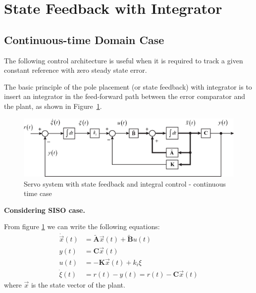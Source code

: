 \documentclass[11pt,a4paper,oneside]{book}
\numberwithin{equation}{section}
\theoremstyle{it}
\theoremstyle{definition}
\begin{document}
\section{State Feedback with Integrator}
\subsection{Continuous-time Domain Case}
The following control architecture is useful when it is required to track a 
given constant reference with zero steady state error.

The basic principle of the pole placement (or state feedback) with integrator 
is to insert an integrator in the feed-forward path between the error 
comparator and the plant, as shown in Figure~\ref{figure_servo_tc_1}.
\begin{figure}[H]
	\centering
	\includegraphics[width = 440pt, 
	keepaspectratio]{figures/servo_ct_3.eps}
	\captionsetup{width=0.5\textwidth, font=small}
	\caption{Servo system with state feedback and integral control - continuous 
		time case}
	\label{figure_servo_tc_1}
\end{figure}

\noindent\textbf{Considering SISO case.}

From figure \ref{figure_servo_tc_1} we can write the following equations:
\begin{equation}\label{eq_servo_ct_1}
	\begin{aligned}
		\dot{\vec{x}}(t) &= 
		\tilde{\mathbf{A}}\vec{x}(t)+\tilde{\mathbf{B}}{u}(t) \\[6pt]
		{y}(t) &= {\mathbf{C}}\vec{x}(t) \\[6pt]
		u(t) &= -{\mathbf{K}}\vec{x}(t) + k_i\xi \\[6pt]
		\dot{\xi}(t) &= r(t) - y(t) = r(t)-{\mathbf{C}}\vec{x}(t)
	\end{aligned}
\end{equation}
where $\vec{x}$ is the state vector of the plant.
\end{document}
